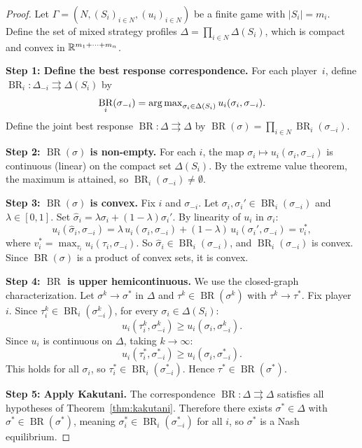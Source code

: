 \documentclass[11pt,a4paper]{article}
\DeclareMathOperator{\BR}{BR}
\begin{document}
\begin{proof}
Let $\Gamma = (N, (S_i)_{i \in N}, (u_i)_{i \in N})$ be a finite game with
$|S_i| = m_i$. Define the set of mixed strategy profiles
$\Delta = \prod_{i \in N} \Delta(S_i)$, which is compact and convex in
$\mathbb{R}^{m_1 + \cdots + m_n}$.

\textbf{Step 1: Define the best response correspondence.}
For each player~$i$, define $\BR_i : \Delta_{-i} \rightrightarrows \Delta(S_i)$ by
\[
    \BR_i(\sigma_{-i}) = \argmax_{\sigma_i \in \Delta(S_i)}
    u_i(\sigma_i, \sigma_{-i}).
\]
Define the joint best response $\BR : \Delta \rightrightarrows \Delta$ by
$\BR(\sigma) = \prod_{i \in N} \BR_i(\sigma_{-i})$.

\textbf{Step 2: $\BR(\sigma)$ is non-empty.}
For each $i$, the map $\sigma_i \mapsto u_i(\sigma_i, \sigma_{-i})$ is
continuous (linear) on the compact set $\Delta(S_i)$. By the extreme value
theorem, the maximum is attained, so $\BR_i(\sigma_{-i}) \neq \emptyset$.

\textbf{Step 3: $\BR(\sigma)$ is convex.}
Fix $i$ and $\sigma_{-i}$. Let $\sigma_i, \sigma_i' \in \BR_i(\sigma_{-i})$
and $\lambda \in [0,1]$. Set
$\hat{\sigma}_i = \lambda \sigma_i + (1-\lambda)\sigma_i'$. By linearity of
$u_i$ in $\sigma_i$:
\[
    u_i(\hat{\sigma}_i, \sigma_{-i})
    = \lambda\, u_i(\sigma_i, \sigma_{-i})
    + (1-\lambda)\, u_i(\sigma_i', \sigma_{-i})
    = v_i^*,
\]
where $v_i^* = \max_{\tau_i} u_i(\tau_i, \sigma_{-i})$. So
$\hat{\sigma}_i \in \BR_i(\sigma_{-i})$, and $\BR_i(\sigma_{-i})$ is convex.
Since $\BR(\sigma)$ is a product of convex sets, it is convex.

\textbf{Step 4: $\BR$ is upper hemicontinuous.}
We use the closed-graph characterization. Let $\sigma^k \to \sigma^*$ in
$\Delta$ and $\tau^k \in \BR(\sigma^k)$ with $\tau^k \to \tau^*$. Fix
player~$i$. Since $\tau_i^k \in \BR_i(\sigma_{-i}^k)$, for every
$\sigma_i \in \Delta(S_i)$:
\[
    u_i(\tau_i^k, \sigma_{-i}^k) \geq u_i(\sigma_i, \sigma_{-i}^k).
\]
Since $u_i$ is continuous on $\Delta$, taking $k \to \infty$:
\[
    u_i(\tau_i^*, \sigma_{-i}^*) \geq u_i(\sigma_i, \sigma_{-i}^*).
\]
This holds for all $\sigma_i$, so $\tau_i^* \in \BR_i(\sigma_{-i}^*)$.
Hence $\tau^* \in \BR(\sigma^*)$.

\textbf{Step 5: Apply Kakutani.}
The correspondence $\BR : \Delta \rightrightarrows \Delta$ satisfies all
hypotheses of Theorem~\ref{thm:kakutani}. Therefore there exists
$\sigma^* \in \Delta$ with $\sigma^* \in \BR(\sigma^*)$, meaning
$\sigma_i^* \in \BR_i(\sigma_{-i}^*)$ for all $i$, so $\sigma^*$ is a
Nash equilibrium.
\end{proof}
\end{document}
